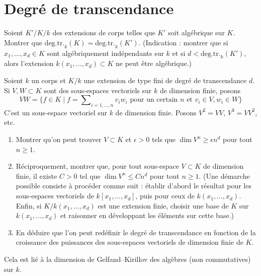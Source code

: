 \section{Degré de transcendance}
\label{section-transcendence}

\begin{exercise}
\label{exercise-algebraic-extension}
Soient $K'/K/k$ des extensions de corps telles que $K'$ soit
algébrique sur $K$. Montrer que $\text{deg.tr.}_k(K) = \text{deg.tr.}_k(K')$.
(Indication : montrer que si $x_1, \ldots, x_d \in K$ sont algébriquement indépendants
sur $k$ et si $d < \text{deg.tr.}_k(K')$, alors l'extension $k(x_1, \ldots, x_d) \subset K$
ne peut être algébrique.)
\end{exercise}

\begin{exercise}
\label{exercise-growth-powers-subvector-space}
Soient $k$ un corps et $K/k$ une extension de type fini
de degré de transcendance $d$.
Si $V, W \subset K$ sont des sous-espaces vectoriels sur $k$ de dimension finie,
posons
$$
VW = \{f \in K \mid f = \sum\nolimits_{i = 1, \ldots, n} v_i w_i
\text{ pour un certain }n\text{ et }v_i \in V, w_i \in W\}
$$
C'est un sous-espace vectoriel sur $k$ de dimension finie.
Posons $V^2 = VV$, $V^3 = V V^2$, etc.
\begin{enumerate}
\item Montrer qu'on peut trouver $V \subset K$ et $\epsilon > 0$ tels que
$\dim V^n \geq \epsilon n^d$ pour tout $n \geq 1$.
\item Réciproquement, montrer que, pour tout sous-espace $V \subset K$ de dimension finie,
il existe $C > 0$ tel que $\dim V^n \leq C n^d$ pour tout $n \geq 1$.
(Une démarche possible consiste à procéder comme suit :
établir d'abord le résultat pour les sous-espaces vectoriels de $k[x_1, \ldots, x_d]$,
puis pour ceux de $k(x_1, \ldots, x_d)$.
Enfin, si $K/k(x_1, \ldots, x_d)$ est une extension finie,
choisir une base de $K$ sur $k(x_1, \ldots, x_d)$ et
raisonner en développant les éléments sur cette base.)
\item En déduire que l'on peut redéfinir le degré de transcendance en fonction
de la croissance des puissances des sous-espaces vectoriels de dimension finie de $K$.
\end{enumerate}
Cela est lié à la dimension de Gelfand--Kirillov des algèbres
(non commutatives) sur $k$.
\end{exercise}








